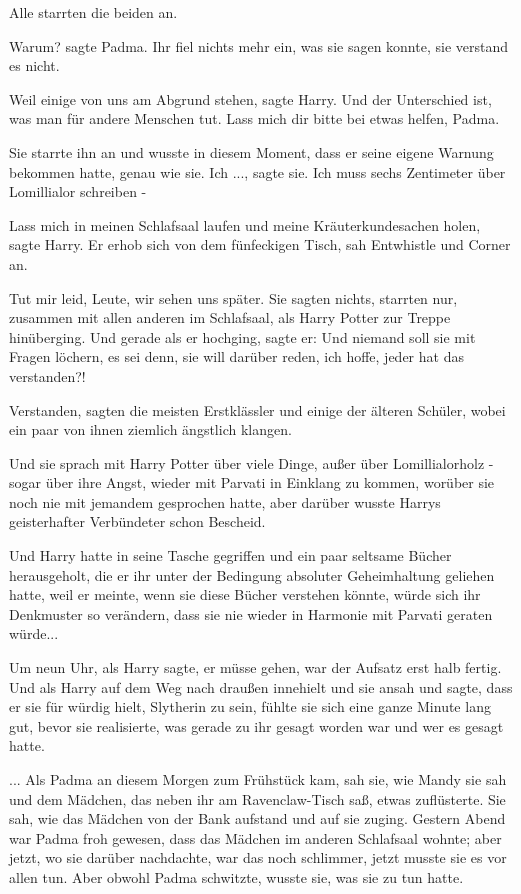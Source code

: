 Alle starrten die beiden an.

\glqq{}Warum?\grqq{} sagte Padma. Ihr fiel nichts mehr ein, was sie sagen konnte,
sie verstand es nicht.

\glqq{}Weil einige von uns am Abgrund stehen\grqq{}, sagte Harry. \glqq{}Und der
Unterschied ist, was man für andere Menschen tut. Lass mich dir bitte bei etwas
helfen, Padma.\grqq{}

Sie starrte ihn an und wusste in diesem Moment, dass er seine eigene Warnung
bekommen hatte, genau wie sie. \glqq{}Ich ...\grqq{}, sagte sie. \glqq{}Ich muss
sechs Zentimeter über Lomillialor schreiben -\grqq{}

\glqq{}Lass mich in meinen Schlafsaal laufen und meine Kräuterkundesachen
holen\grqq{}, sagte Harry. Er erhob sich von dem fünfeckigen Tisch, sah
Entwhistle und Corner an.

\glqq{}Tut mir leid, Leute, wir sehen uns später.\grqq{} Sie sagten nichts, starrten
nur, zusammen mit allen anderen im Schlafsaal, als Harry Potter zur Treppe
hinüberging. Und gerade als er hochging, sagte er: \glqq{}Und niemand soll sie
mit Fragen löchern, es sei denn, sie will darüber reden, ich hoffe, jeder hat
das verstanden?!\grqq{}

\glqq{}Verstanden\grqq{}, sagten die meisten Erstklässler und einige der älteren
Schüler, wobei ein paar von ihnen ziemlich ängstlich klangen.

Und sie sprach mit Harry Potter über viele Dinge, außer über Lomillialorholz -
sogar über ihre Angst, wieder mit Parvati in Einklang zu kommen, worüber sie
noch nie mit jemandem gesprochen hatte, aber darüber wusste Harrys geisterhafter
Verbündeter schon Bescheid.

Und Harry hatte in seine Tasche gegriffen und ein paar seltsame Bücher
herausgeholt, die er ihr unter der Bedingung absoluter Geheimhaltung geliehen
hatte, weil er meinte, wenn sie diese Bücher verstehen könnte, würde sich ihr
Denkmuster so verändern, dass sie nie wieder in Harmonie mit Parvati geraten
würde...

Um neun Uhr, als Harry sagte, er müsse gehen, war der Aufsatz erst halb fertig.
Und als Harry auf dem Weg nach draußen innehielt und sie ansah und sagte, dass
er sie für würdig hielt, Slytherin zu sein, fühlte sie sich eine ganze Minute
lang gut, bevor sie realisierte, was gerade zu ihr gesagt worden war und wer es
gesagt hatte.

... Als Padma an diesem Morgen zum Frühstück kam, sah sie, wie Mandy sie sah und
dem Mädchen, das neben ihr am Ravenclaw-Tisch saß, etwas zuflüsterte. Sie sah,
wie das Mädchen von der Bank aufstand und auf sie zuging. Gestern Abend war
Padma froh gewesen, dass das Mädchen im anderen Schlafsaal wohnte; aber jetzt,
wo sie darüber nachdachte, war das noch schlimmer, jetzt musste sie es vor allen
tun. Aber obwohl Padma schwitzte, wusste sie, was sie zu tun hatte.

